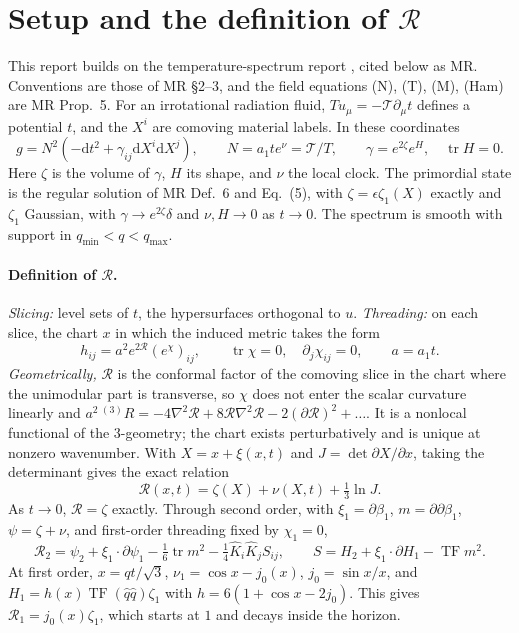 \documentclass[10pt]{article}
\newcommand{\eps}{\epsilon}
\newcommand{\dd}{\mathrm{d}}
\newcommand{\TF}{\operatorname{TF}}
\newcommand{\R}{\mathcal R}
\newcommand{\Kh}{\hat K}
\newcommand{\qh}{\hat q}
\begin{document}
\section{Setup and the definition of \texorpdfstring{$\R$}{R}}

This report builds on the temperature-spectrum report \cite{MR}, cited below as MR. Conventions are those of MR \S2--3, and the field equations (N), (T), (M), (Ham) are MR Prop.~5. For an irrotational radiation fluid, $Tu_\mu=-\mathcal T\partial_\mu t$ defines a potential $t$, and the $X^i$ are comoving material labels. In these coordinates
\begin{equation}
g=N^2(-\dd t^2+\gamma_{ij}\dd X^i\dd X^j),\qquad N=a_1te^{\nu}=\mathcal T/T,\qquad\gamma=e^{2\zeta}e^{H},\quad\operatorname{tr}H=0 .
\end{equation}
Here $\zeta$ is the volume of $\gamma$, $H$ its shape, and $\nu$ the local clock. The primordial state is the regular solution of MR Def.~6 and Eq.~(5), with $\zeta=\eps\zeta_1(X)$ exactly and $\zeta_1$ Gaussian, with $\gamma\to e^{2\zeta}\delta$ and $\nu,H\to0$ as $t\to0$. The spectrum is smooth with support in $q_{\min}<q<q_{\max}$.

\paragraph{Definition of $\R$.} \emph{Slicing:} level sets of $t$, the hypersurfaces orthogonal to $u$. \emph{Threading:} on each slice, the chart $x$ in which the induced metric takes the form
\begin{equation}\label{eq:defR}
h_{ij}=a^2e^{2\R}(e^{\chi})_{ij},\qquad\operatorname{tr}\chi=0,\quad\partial_j\chi_{ij}=0,\qquad a=a_1t .
\end{equation}
\emph{Geometrically,} $\R$ is the conformal factor of the comoving slice in the chart where the unimodular part is transverse, so $\chi$ does not enter the scalar curvature linearly and $a^2\,{}^{(3)}\!R=-4\nabla^2\R+8\R\nabla^2\R-2(\partial\R)^2+\dots$. It is a nonlocal functional of the 3-geometry; the chart exists perturbatively and is unique at nonzero wavenumber. With $X=x+\xi(x,t)$ and $J=\det\partial X/\partial x$, taking the determinant gives the exact relation
\begin{equation}\label{eq:R-exact}
\R(x,t)=\zeta(X)+\nu(X,t)+\tfrac13\ln J .
\end{equation}
As $t\to0$, $\R=\zeta$ exactly. Through second order, with $\xi_1=\partial\beta_1$, $m=\partial\partial\beta_1$, $\psi=\zeta+\nu$, and first-order threading fixed by $\chi_1=0$,
\begin{equation}\label{eq:R2}
\R_2=\psi_2+\xi_1\!\cdot\!\partial\psi_1-\tfrac16\operatorname{tr}m^2-\tfrac14\Kh_i\Kh_jS_{ij},\qquad
S=H_2+\xi_1\!\cdot\!\partial H_1-\TF m^2 .
\end{equation}
At first order, $x=qt/\sqrt3$, $\nu_1=\cos x-j_0(x)$, $j_0=\sin x/x$, and $H_1=h(x)\TF(\qh\qh)\zeta_1$ with $h=6(1+\cos x-2j_0)$. This gives $\R_1=j_0(x)\zeta_1$, which starts at $1$ and decays inside the horizon.
\end{document}
